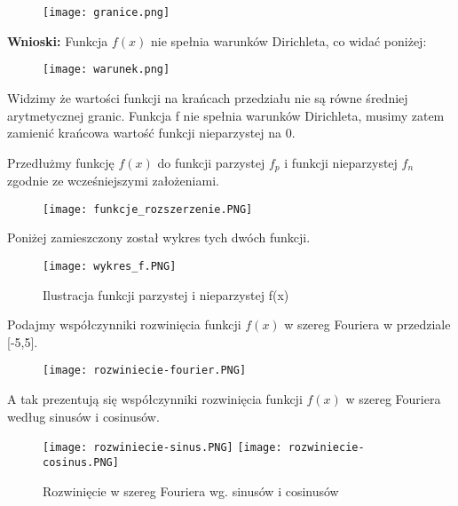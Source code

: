 \documentclass[12pt]{article}
\begin{document}
\begin{figure}[ht!]
\centering
\texttt{[image: granice.png]}
\label{fig:granice}
\end{figure}

\textbf{Wnioski:} 
Funkcja $f(x)$ nie spełnia warunków Dirichleta, co widać poniżej:

\begin{figure}[ht!]
\centering
\texttt{[image: warunek.png]}
\label{fig:warunek}
\end{figure}


\newpage
\smallskip

Widzimy że wartości funkcji na krańcach przedziału nie są równe średniej arytmetycznej 
granic. Funkcja f nie spełnia warunków Dirichleta, musimy zatem zamienić krańcowa wartość funkcji nieparzystej na 0.

\bigskip

\bigskip

Przedłużmy funkcję $f(x)$ do funkcji parzystej $f_p$ i funkcji nieparzystej $f_n$ zgodnie ze wcześniejszymi założeniami.

\bigskip

\begin{figure}[ht!]
\centering
\texttt{[image: funkcje\_rozszerzenie.PNG]}
\label{fig:fp-fn}
\end{figure}

\bigskip

Poniżej zamieszczony został wykres tych dwóch funkcji.

\begin{figure}[ht!]
\centering
\texttt{[image: wykres\_f.PNG]}
\caption{Ilustracja funkcji parzystej i nieparzystej f(x)}
\label{fig:wykres2d}
\end{figure}


\newpage
Podajmy współczynniki rozwinięcia funkcji $f(x)$ w szereg Fouriera w przedziale [-5,5].

\begin{figure}[ht!]
\centering
\texttt{[image: rozwiniecie-fourier.PNG]}
\label{fig:fourier}
\end{figure}

\bigskip

A tak prezentują się współczynniki rozwinięcia funkcji $f(x)$ w szereg Fouriera według
sinusów i cosinusów.

\begin{figure}[ht!]
\centering
\subfloat{\label{fig:rozwiniecie-sinus}}
\texttt{[image: rozwiniecie-sinus.PNG]}
\quad
\subfloat{\label{fig:rozwiniecie-cosinus}}
\texttt{[image: rozwiniecie-cosinus.PNG]}
\caption{Rozwinięcie w szereg Fouriera wg. sinusów i cosinusów}
\end{figure}
\end{document}
